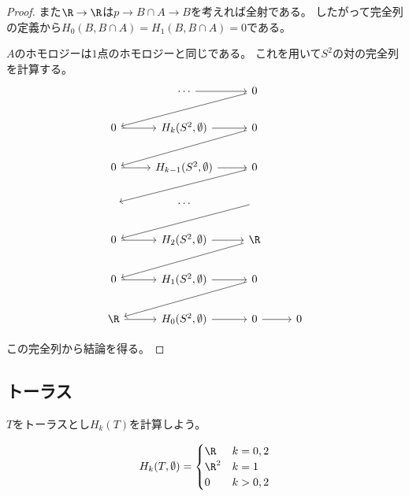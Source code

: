 \documentclass{jsarticle}
\begin{document}
\begin{proof}
また$\R\to \R$は$p\to B\cap A\to B$を考えれば全射である。
したがって完全列の定義から$H_0(B,B\cap A)=H_1(B,B\cap A)=0$である。

$A$のホモロジーは$1$点のホモロジーと同じである。
これを用いて$S^2$の対の完全列を計算する。
\[
\begin{tikzcd}
~ &\cdots \ar[r] &0 \ar[dll]\\
0 \ar[r] &H_k(S^2,\emptyset) \ar[r] &0 \ar[dll]\\
0 \ar[r] &H_{k-1}(S^2,\emptyset) \ar[r] &0 \ar[dll]\\
~&\cdots&\ar[dll]\\
0 \ar[r] &H_{2}(S^2,\emptyset) \ar[r] &\R \ar[dll]\\
0 \ar[r] &H_{1}(S^2,\emptyset) \ar[r] &0 \ar[dll]\\
\R \ar[r] &H_{0}(S^2,\emptyset) \ar[r] &0 \ar[r]&0
\end{tikzcd}
\]

この完全列から結論を得る。
\end{proof}

\subsection{トーラス}
$T$をトーラスとし$H_k(T)$を計算しよう。

\begin{prop}
\[
H_k(T,\emptyset)=\begin{cases}\R&k=0,2\\\R^2&k=1\\0&k>0,2\end{cases}
\]
\end{prop}
\end{document}
